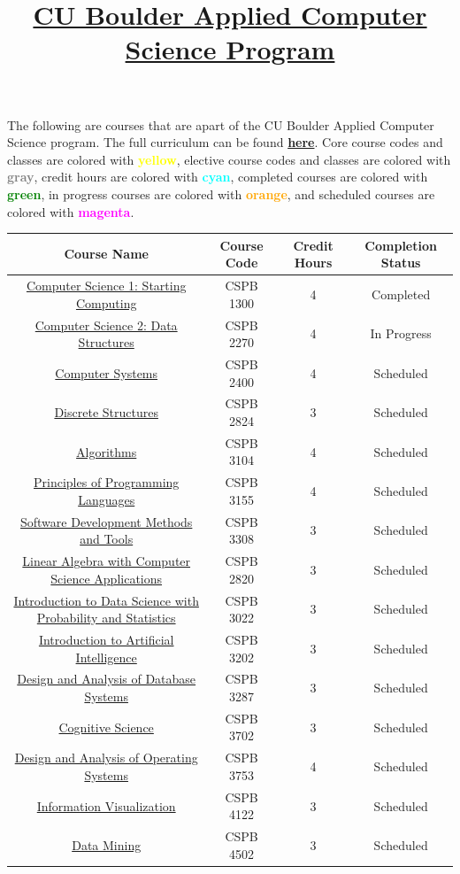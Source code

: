 \documentclass{article}
\title{\href{https://www.colorado.edu/program/cspb/}{\textbf{CU Boulder Applied Computer Science Program}}}
\author{}
\date{}
\newcommand{\coreclass}{\cellcolor{yellow!25}}
\newcommand{\electiveclass}{\cellcolor{gray!25}}
\newcommand{\credithours}{\cellcolor{cyan!25}}
\newcommand{\header}{\cellcolor{gray!25}}
\newcommand{\completed}{\cellcolor{green!25} Completed}
\newcommand{\inprogress}{\cellcolor{orange!25} In Progress}
\newcommand{\scheduled}{\cellcolor{magenta!25} Scheduled}
\newcommand{\CSPBIntro}{\href{https://www.colorado.edu/program/cspb/cspb-1300-computer-science-1-starting-computing}{Computer Science 1: Starting Computing}}
\newcommand{\CSPBDataStruct}{\href{https://www.colorado.edu/program/cspb/cspb-2270-computer-science-2-data-structures}{Computer Science 2: Data Structures}}
\newcommand{\CSPBCompSys}{\href{https://www.colorado.edu/program/cspb/cspb-2400-computer-systems}{Computer Systems}}
\newcommand{\CSPBDisc}{\href{https://www.colorado.edu/program/cspb/cspb-2824-discrete-structures}{Discrete Structures}}
\newcommand{\CSPBAlgo}{\href{https://www.colorado.edu/program/cspb/cspb-3104-algorithms}{Algorithms}}
\newcommand{\CSPBPrincProg}{\href{https://www.colorado.edu/program/cspb/cspb-3155-principles-programming-languages}{Principles of Programming Languages}}
\newcommand{\CSPBSoftDev}{\href{https://www.colorado.edu/program/cspb/cspb-3308-software-development-methods-and-tools}{Software Development Methods and Tools}}
\newcommand{\CSPBLinAlg}{\href{https://www.colorado.edu/program/cspb/cspb-2820-–-linear-algebra-computer-science-applications}{Linear Algebra with Computer Science Applications}}
\newcommand{\CSPBDataSci}{\href{https://www.colorado.edu/program/cspb/cspb-3022-introduction-data-science-probability-and-statistics}{Introduction to Data Science with Probability and Statistics}}
\newcommand{\CSPBArtIntell}{\href{https://www.colorado.edu/program/cspb/cspb-3202-introduction-artificial-intelligence}{Introduction to Artificial Intelligence}}
\newcommand{\CSPBDataBase}{\href{https://www.colorado.edu/program/cspb/cspb-3287-design-and-analysis-database-systems}{Design and Analysis of Database Systems}}
\newcommand{\CSPBCogSci}{\href{https://www.colorado.edu/program/cspb/cspb-3702-cognitive-science}{Cognitive Science}}
\newcommand{\CSPBOpSys}{\href{https://www.colorado.edu/program/cspb/cspb-3753-design-and-analysis-operating-systems}{Design and Analysis of Operating Systems}}
\newcommand{\CSPBInfoVis}{\href{https://www.colorado.edu/program/cspb/cspb-4122-information-visualization}{Information Visualization}}
\newcommand{\CSPBDataMin}{\href{https://www.colorado.edu/program/cspb/cspb-4502-data-mining}{Data Mining}}
\begin{document}
\maketitle
The following are courses that are apart of the CU Boulder Applied Computer Science program. The full curriculum can be found \href{https://www.colorado.edu/program/cspb/academics/curriculum-course-list}{\textbf{here}}. Core course codes and classes are colored with \textcolor{yellow}{\textbf{yellow}}, elective course codes and classes are colored with \textcolor{gray}{\textbf{gray}}, credit hours are colored with \textcolor{cyan}{\textbf{cyan}}, completed courses are colored with \textcolor{green}{\textbf{green}}, in progress courses are colored with \textcolor{orange}{\textbf{orange}}, and scheduled courses are colored with \textcolor{magenta}{\textbf{magenta}}.
\begin{table}[ht]
\centering
\begin{tabular}{|c|c|c|c|}
    \hline
    \header \textbf{Course Name} & \header \textbf{Course Code} & \header \textbf{Credit Hours} \header & \header \textbf{Completion Status} \\ \hline 
    \coreclass \CSPBIntro & \coreclass CSPB 1300 & \credithours 4 & \completed \\ \hline
    \coreclass \CSPBDataStruct & \coreclass CSPB 2270 & \credithours 4 & \inprogress \\ \hline
    \coreclass \CSPBCompSys & \coreclass CSPB 2400 & \credithours 4 & \scheduled \\ \hline
    \coreclass \CSPBDisc & \coreclass CSPB 2824 & \credithours 3 & \scheduled \\ \hline
    \coreclass \CSPBAlgo & \coreclass CSPB 3104 & \credithours 4 & \scheduled \\ \hline
    \coreclass \CSPBPrincProg & \coreclass CSPB 3155 & \credithours 4 & \scheduled \\ \hline
    \coreclass \CSPBSoftDev & \coreclass CSPB 3308 & \credithours 3 & \scheduled \\ \hline
    \electiveclass \CSPBLinAlg & \electiveclass CSPB 2820 & \credithours 3 & \scheduled \\ \hline
    \electiveclass \CSPBDataSci & \electiveclass CSPB 3022 & \credithours 3 & \scheduled \\ \hline
    \electiveclass \CSPBArtIntell & \electiveclass CSPB 3202 & \credithours 3 & \scheduled \\ \hline
    \electiveclass \CSPBDataBase & \electiveclass CSPB 3287 & \credithours 3 & \scheduled \\ \hline
    \electiveclass \CSPBCogSci & \electiveclass CSPB 3702 & \credithours 3 & \scheduled \\ \hline
    \electiveclass \CSPBOpSys & \electiveclass CSPB 3753 & \credithours 4 & \scheduled \\ \hline
    \electiveclass \CSPBInfoVis & \electiveclass CSPB 4122 & \credithours 3 & \scheduled \\ \hline
    \electiveclass \CSPBDataMin & \electiveclass CSPB 4502 & \credithours 3 & \scheduled \\ \hline    
\end{tabular}
\end{table}
\end{document}
